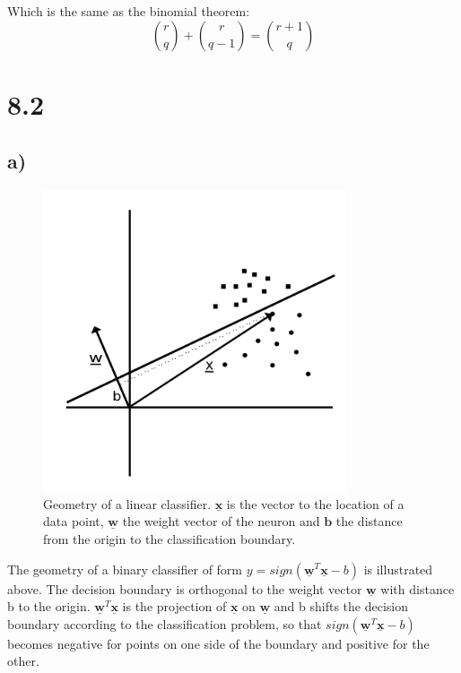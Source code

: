 \documentclass[11pt,a4paper]{article}
\begin{document}
Which is the same as the binomial theorem:
\begin{equation}
{r \choose q} + {r \choose q-1} = {r+1 \choose q}
\end{equation}

\section*{8.2}
\subsection*{a)}

\begin{figure}[h]
  \includegraphics[width=0.8\textwidth]{geometry.png}
  \caption{Geometry of a linear classifier. $\underline{\mathbf{x}}$ is the vector to the location of a data point, $\underline{\mathbf{w}}$ the weight vector of the neuron and $\mathbf{b}$ the distance from the origin to the classification boundary.}
\end{figure}

The geometry of a binary classifier of form $y = sign(\underline{\mathbf{w}}^T\underline{\mathbf{x}} - b)$ is illustrated above. The decision boundary is orthogonal to the weight vector $\underline{\mathbf{w}}$ with distance b to the origin. $\underline{\mathbf{w}}^T\underline{\mathbf{x}}$ is the projection of $\underline{\mathbf{x}}$ on $\underline{\mathbf{w}}$ and b shifts the decision boundary according to the classification problem, so that $sign(\underline{\mathbf{w}}^T\underline{\mathbf{x}} - b)$ becomes negative for points on one side of the boundary and positive for the other.
\end{document}
